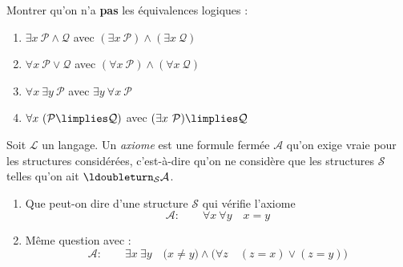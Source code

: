 \documentclass[11pt,class=report,crop=false]{standalone}
\begin{document}
\begin{exercicecours}
Montrer qu'on n'a \textbf{pas} les équivalences logiques :
\begin{enumerate}
	\item $\exists x \ \mathcal{P} \land \mathcal{Q}$
	avec $(\exists x \ \mathcal{P}) \land (\exists x \ \mathcal{Q})$
	
	\item $\forall x \ \mathcal{P} \lor \mathcal{Q}$
	avec $(\forall x \ \mathcal{P}) \land (\forall x \ \mathcal{Q})$
	
	\item $\forall x \ \exists y \ \mathcal{P}$
	avec $\exists y \ \forall x \ \mathcal{P}$
	
	\item $\forall x \ (\mathcal{P} \limplies \mathcal{Q})$
	avec $(\exists x \ \mathcal{P}) \limplies \mathcal{Q}$	
	
\end{enumerate}
\end{exercicecours}


\begin{exercicecours}
Soit $\mathcal{L}$ un langage. Un \emph{axiome} est une formule fermée  $\mathcal{A}$ qu'on exige vraie pour les structures considérées, c'est-à-dire qu'on ne considère que les structures $\mathcal{S}$ telles qu'on ait $\ldoubleturn_{\mathcal{S}} \mathcal{A}$.
\begin{enumerate}
	\item Que peut-on dire d'une structure $\mathcal{S}$ qui vérifie l'axiome
	\[
	\mathcal{A} : \qquad \forall x \ \forall y \quad x=y 
	\]
	
	
	\item Même question avec :
	\[
	\mathcal{A} : \qquad \exists x \ \exists y \quad \big(x\neq y\big) \land \big(\forall z \quad (z=x) \lor (z=y) \big) 
	\]	
\end{enumerate}
\end{exercicecours}
\end{document}
